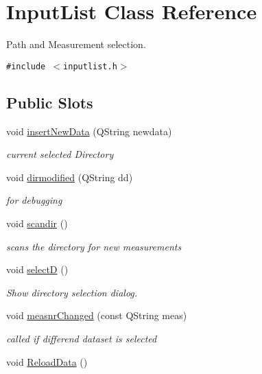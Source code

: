 \hypertarget{class_input_list}{
\section{InputList Class Reference}
\label{class_input_list}
}
Path and Measurement selection.  


{\tt \#include $<$inputlist.h$>$}

\subsection*{Public Slots}
\begin{CompactItemize}
\item 
void \hyperlink{class_input_list_36d4f06e3929f82e71bd2429be776f13}{insertNewData} (QString newdata)
\begin{CompactList}\small\item\em current selected Directory \item\end{CompactList}\item 
void \hyperlink{class_input_list_23a669cb1d1b927350a85639d7b5d6c6}{dirmodified} (QString dd)
\begin{CompactList}\small\item\em for debugging \item\end{CompactList}\item 
void \hyperlink{class_input_list_03015f736a0d4684e255f89f26d4590b}{scandir} ()
\begin{CompactList}\small\item\em scans the directory for new measurements \item\end{CompactList}\item 
void \hyperlink{class_input_list_5644d4b644bf4fb1849bfe89b68559ec}{selectD} ()
\begin{CompactList}\small\item\em Show directory selection dialog. \item\end{CompactList}\item 
\hypertarget{class_input_list_7d385f9b42cd289071bc575261589dd4}{
void \hyperlink{class_input_list_7d385f9b42cd289071bc575261589dd4}{measnrChanged} (const QString meas)}
\label{class_input_list_7d385f9b42cd289071bc575261589dd4}

\begin{CompactList}\small\item\em called if differend dataset is selected \item\end{CompactList}\item 
\hypertarget{class_input_list_e8d041be4e423768a888856eba3d5cd2}{
void \hyperlink{class_input_list_e8d041be4e423768a888856eba3d5cd2}{ReloadData} ()}
\label{class_input_list_e8d041be4e423768a888856eba3d5cd2}


\end{CompactItemize}
